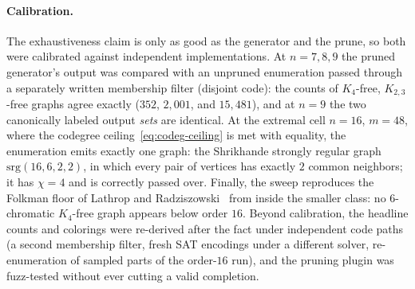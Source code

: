 \documentclass[11pt]{article}
\theoremstyle{definition}
\newcommand{\chrom}{\chi}
\begin{document}
\paragraph{Calibration.} The exhaustiveness claim is only as good as the
generator and the prune, so both were calibrated against independent
implementations. At $n = 7, 8, 9$ the pruned generator's output was compared
with an unpruned enumeration passed through a separately written membership
filter (disjoint code): the counts of $K_4$-free, $K_{2,3}$-free graphs agree
exactly ($352$, $2{,}001$, and $15{,}481$), and at $n = 9$ the two canonically
labeled output \emph{sets} are identical. At the extremal cell $n = 16$,
$m = 48$, where the codegree ceiling~\eqref{eq:codeg-ceiling} is met with
equality, the enumeration emits exactly one graph: the Shrikhande strongly
regular graph $\mathrm{srg}(16,6,2,2)$, in which every pair of vertices has
exactly $2$ common neighbors; it has $\chrom = 4$ and is correctly passed
over. Finally, the sweep reproduces the Folkman floor of Lathrop and
Radziszowski~\cite{LathropRadziszowski2011} from inside the smaller class: no
$6$-chromatic $K_4$-free graph appears below order $16$. Beyond calibration,
the headline counts and colorings were re-derived after the fact under
independent code paths (a second membership filter, fresh SAT encodings under
a different solver, re-enumeration of sampled parts of the order-$16$ run),
and the pruning plugin was fuzz-tested without ever cutting a valid
completion.
\end{document}
